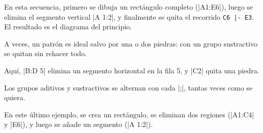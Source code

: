 En esta secuencia, primero se dibuja un rectángulo completo (|A1:E6|), luego se elimina el segmento vertical |A 1:2|, y finalmente se quita el recorrido \verb+C6 |- E3+. El resultado es el diagrama del principio.

A veces, un patrón es ideal salvo por una o dos piedras: con un grupo sustractivo se quitan sin rehacer todo.

\begin{codeexample}[width=6cm]
	\begin{goban}[label = {at = all}]
	\end{goban}
\end{codeexample}

Aquí, |B:D 5| elimina un segmento horizontal en la fila 5, y |C2| quita una piedra.

Los grupos aditivos y sustractivos se alternan con cada |;|, tantas veces como se quiera.

\begin{codeexample}[width=6cm]
	\begin{goban}[label = {at = all}, partial = A1:E6]
	\end{goban}
	
	\begin{goban}[label = {at = all}, partial = A1:E6]
	\end{goban}
	
	\begin{goban}[label = {at = all}, partial = A1:E6]
	\end{goban}
\end{codeexample}

En este último ejemplo, se crea un rectángulo, se eliminan dos regiones (|A1:C4| y |E6|), y luego se añade un segmento (|A 1:2|).
